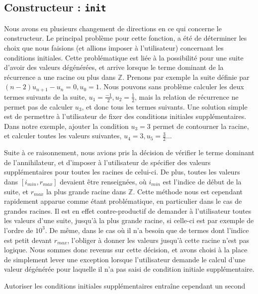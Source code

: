 \documentclass[12pt]{article}
\newlength{\charwidth}
\newcommand{\uline}{\underline{\hspace{2\charwidth}}}
\begin{document}
    \subsection{Constructeur : \texttt{\uline init\uline}}
        \label{sec:cons}
        Nous avons eu plusieurs changement de directions en ce qui concerne le constructeur.
        Le principal problème pour cette fonction, a été de déterminer les choix que nous
        faisions (et allions imposer à l'utilisateur) concernant les conditions initiales.
        Cette problématique est liée à la possibilité pour une suite d'avoir des
        valeurs dégénérées, et arrive lorsque le terme dominant de la récurrence 
        a une racine ou plus dans $\mathbb Z$. Prenons par exemple la suite
        définie par $(n-2)u_{n+1} - u_n = 0, u_0 = 1$. Nous pouvons sans problème calculer
        les deux termes suivants de la suite, $u_1 = \frac{-1}{2}, u_2 = \frac{1}{2}$,
        mais la relation de récurrence ne permet pas de calculer $u_3$, et donc tous les termes suivants.
        Une solution simple est de permettre à l'utilisateur de fixer des conditions initiales
        supplémentaires. Dans notre exemple, ajouter la condition $u_3 = 3$ permet de
        contourner la racine, et calculer toutes les valeurs suivantes, $u_4 = 3,u_5=\frac{3}{2}\ldots$
        \par Suite à ce raisonnement, nous avions pris la décision de vérifier le terme
        dominant de l'annihilateur, et d'imposer à l'utilisateur de spécifier des 
        valeurs supplémentaires pour toutes les racines de celui-ci. De plus,
        toutes les valeurs dans $[i_{min},r_{max}]$ devaient être renseignées,
        où $i_{min}$ est l'indice de début de la suite, et $r_{max}$ la plus grande racine 
        dans $\mathbb Z$. Cette méthode nous est cependant rapidement apparue comme étant
        problématique, en particulier dans le cas de grandes racines. Il est en effet
        contre-productif de demander à l'utilisateur toutes les valeurs d'une suite,
        jusqu'à la plus grande racine, si celle-ci est par exemple de l'ordre de $10^3$.
        De même, dans le cas où il n'a besoin que de termes dont l'indice est petit devant
        $r_{max}$, l'obliger à donner les valeurs jusqu'à cette racine n'est pas logique.
        Nous sommes donc revenus sur cette décision, et avons choisi à la place de simplement
        lever une exception lorsque l'utilisateur demande le calcul d'une valeur dégénérée
        pour laquelle il n'a pas saisi de condition initiale supplémentaire.
        \par Autoriser les conditions initiales supplémentaires entraîne cependant un second
\end{document}
